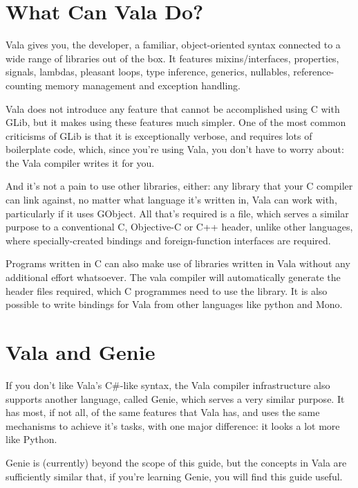 \section{What Can Vala Do?}

Vala gives you, the developer, a familiar, object-oriented syntax connected to
a wide range of libraries out of the box.  It features mixins/interfaces,
properties, signals, lambdas, pleasant  loops, type inference,
generics, nullables, reference-counting memory management and exception
handling.

Vala does not introduce any feature that cannot be accomplished using C with
GLib, but it makes using these features much simpler.  One of the most common
criticisms of GLib is that it is exceptionally verbose, and requires lots of
boilerplate code, which, since you're using Vala, you don't have to worry
about: the Vala compiler writes it for you.

And it's not a pain to use other libraries, either: any library that your C
compiler can link against, no matter what language it's written in, Vala can
work with, particularly if it uses GObject.  All that's required is a
 file, which serves a similar purpose to a conventional C,
Objective-C or C++ header, unlike other languages, where specially-created
bindings and foreign-function interfaces are required.

Programs written in C can also make use of libraries written in Vala without
any additional effort whatsoever. The vala compiler will automatically
generate the header files required, which C programmes need to use the
library. It is also possible to write bindings for Vala from other languages
like python and Mono.

\section{Vala and Genie}

If you don't like Vala's C\#-like syntax, the Vala compiler infrastructure
also supports another language, called Genie, which serves a very similar
purpose.  It has most, if not all, of the same features that Vala has, and
uses the same mechanisms to achieve it's tasks, with one major difference: it
looks a lot more like Python.

Genie is (currently) beyond the scope of this guide, but the concepts in Vala
are sufficiently similar that, if you're learning Genie, you will find this
guide useful.

